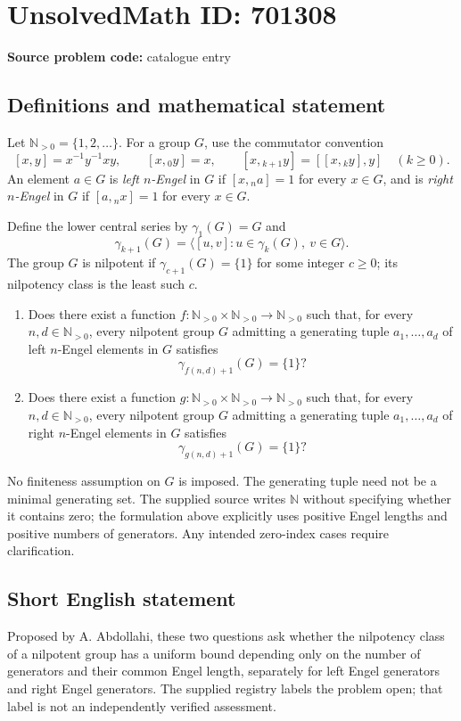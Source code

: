 \documentclass[11pt]{article}
\newcommand{\N}{\mathbb{N}}
\begin{document}
\section*{UnsolvedMath ID: 701308}
\textbf{Source problem code:} catalogue entry
\subsection{Definitions and mathematical statement}
Let \(\N_{>0}=\{1,2,\ldots\}\). For a group \(G\), use the commutator convention
\[
[x,y]=x^{-1}y^{-1}xy,\qquad [x,{}_0y]=x,\qquad [x,{}_{k+1}y]=[[x,{}_ky],y]\quad(k\geq0).
\]
An element \(a\in G\) is \emph{left \(n\)-Engel} in \(G\) if \([x,{}_na]=1\) for every \(x\in G\), and is \emph{right \(n\)-Engel} in \(G\) if \([a,{}_nx]=1\) for every \(x\in G\).

Define the lower central series by \(\gamma_1(G)=G\) and
\[
\gamma_{k+1}(G)=\langle [u,v]:u\in\gamma_k(G),\ v\in G\rangle.
\]
The group \(G\) is nilpotent if \(\gamma_{c+1}(G)=\{1\}\) for some integer \(c\geq0\); its nilpotency class is the least such \(c\).

\begin{enumerate}
\item[(a)] Does there exist a function \(f:\N_{>0}\times\N_{>0}\to\N_{>0}\) such that, for every \(n,d\in\N_{>0}\), every nilpotent group \(G\) admitting a generating tuple \(a_1,\ldots,a_d\) of left \(n\)-Engel elements in \(G\) satisfies
\[
\gamma_{f(n,d)+1}(G)=\{1\}?
\]
\item[(b)] Does there exist a function \(g:\N_{>0}\times\N_{>0}\to\N_{>0}\) such that, for every \(n,d\in\N_{>0}\), every nilpotent group \(G\) admitting a generating tuple \(a_1,\ldots,a_d\) of right \(n\)-Engel elements in \(G\) satisfies
\[
\gamma_{g(n,d)+1}(G)=\{1\}?
\]
\end{enumerate}
No finiteness assumption on \(G\) is imposed. The generating tuple need not be a minimal generating set. The supplied source writes \(\N\) without specifying whether it contains zero; the formulation above explicitly uses positive Engel lengths and positive numbers of generators. Any intended zero-index cases require clarification.
\subsection{Short English statement}
Proposed by A. Abdollahi, these two questions ask whether the nilpotency class of a nilpotent group has a uniform bound depending only on the number of generators and their common Engel length, separately for left Engel generators and right Engel generators. The supplied registry labels the problem open; that label is not an independently verified assessment.
\end{document}
